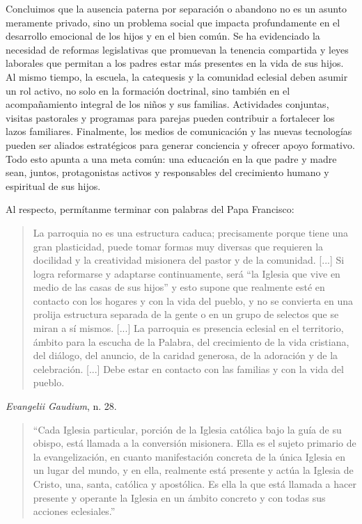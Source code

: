 \documentclass[a4paper,12pt]{article}
\begin{document}
Concluimos que la ausencia paterna por separación o abandono no es un asunto meramente privado, sino un problema social que impacta profundamente en el desarrollo emocional de los hijos y en el bien común. Se ha evidenciado la necesidad de reformas legislativas que promuevan la tenencia compartida y leyes laborales que permitan a los padres estar más presentes en la vida de sus hijos. Al mismo tiempo, la escuela, la catequesis y la comunidad eclesial deben asumir un rol activo, no solo en la formación doctrinal, sino también en el acompañamiento integral de los niños y sus familias. Actividades conjuntas, visitas pastorales y programas para parejas pueden contribuir a fortalecer los lazos familiares. Finalmente, los medios de comunicación y las nuevas tecnologías pueden ser aliados estratégicos para generar conciencia y ofrecer apoyo formativo. Todo esto apunta a una meta común: una educación en la que padre y madre sean, juntos, protagonistas activos y responsables del crecimiento humano y espiritual de sus hijos.

Al respecto, perm\'itanme terminar con palabras del Papa Francisco:

\begin{quote}
	La parroquia no es una estructura caduca; precisamente porque tiene una gran plasticidad, puede tomar formas muy diversas que requieren la docilidad y la creatividad misionera del pastor y de la comunidad. [...] Si logra reformarse y adaptarse continuamente, será “la Iglesia que vive en medio de las casas de sus hijos” y esto supone que realmente esté en contacto con los hogares y con la vida del pueblo, y no se convierta en una prolija estructura separada de la gente o en un grupo de selectos que se miran a sí mismos. [...] La parroquia es presencia eclesial en el territorio, ámbito para la escucha de la Palabra, del crecimiento de la vida cristiana, del diálogo, del anuncio, de la caridad generosa, de la adoración y de la celebración. [...] Debe estar en contacto con las familias y con la vida del pueblo. 
\end{quote}
\hfill \textit{Evangelii Gaudium}, n. 28.

\begin{quote}
	“Cada Iglesia particular, porción de la Iglesia católica bajo la guía de su obispo, está llamada a la conversión misionera. Ella es el sujeto primario de la evangelización, en cuanto manifestación concreta de la única Iglesia en un lugar del mundo, y en ella, realmente está presente y actúa la Iglesia de Cristo, una, santa, católica y apostólica. Es ella la que está llamada a hacer presente y operante la Iglesia en un ámbito concreto y con todas sus acciones eclesiales.”
\end{quote}
	
\end{document}
